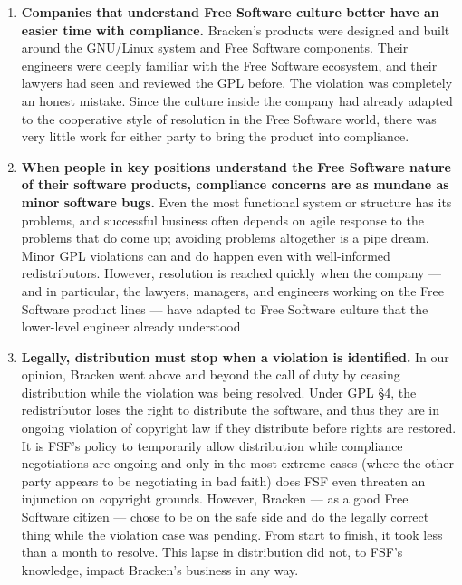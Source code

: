 \begin{enumerate}

\item {\bf Companies that understand Free Software culture better have an
  easier time with compliance.}  Bracken's products were designed and
  built around the GNU/Linux system and Free Software components. Their
  engineers were deeply familiar with the Free Software ecosystem, and
  their lawyers had seen and reviewed the GPL before. The violation was
  completely an honest mistake. Since the culture inside the company had
  already adapted to the cooperative style of resolution in the Free
  Software world, there was very little work for either party to bring the
  product into compliance.

\item {\bf When people in key positions understand the Free Software
  nature of their software products, compliance concerns are as
  mundane as minor software bugs.}  Even the most functional system or
  structure has its problems, and successful business often depends on
  agile response to the problems that do come up; avoiding problems
  altogether is a pipe dream. Minor GPL violations can and do happen
  even with well-informed redistributors. However, resolution is
  reached quickly when the company --- and in particular, the lawyers,
  managers, and engineers working on the Free Software product lines
  --- have adapted to Free Software culture that the lower-level
  engineer already understood

\item {\bf Legally, distribution must stop when a violation is
  identified.}  In our opinion, Bracken went above and beyond the call of
  duty by ceasing distribution while the violation was being resolved.
  Under GPL \S 4, the redistributor loses the right to distribute the
  software, and thus they are in ongoing violation of copyright law if
  they distribute before rights are restored. It is FSF's policy to
  temporarily allow distribution while compliance negotiations are ongoing
  and only in the most extreme cases (where the other party appears to be
  negotiating in bad faith) does FSF even threaten an injunction on
  copyright grounds. However, Bracken --- as a good Free Software citizen
  --- chose to be on the safe side and do the legally correct thing while
  the violation case was pending. From start to finish, it took less
  than a month to resolve. This lapse in distribution did not, to FSF's
  knowledge, impact Bracken's business in any way.


\end{enumerate}
